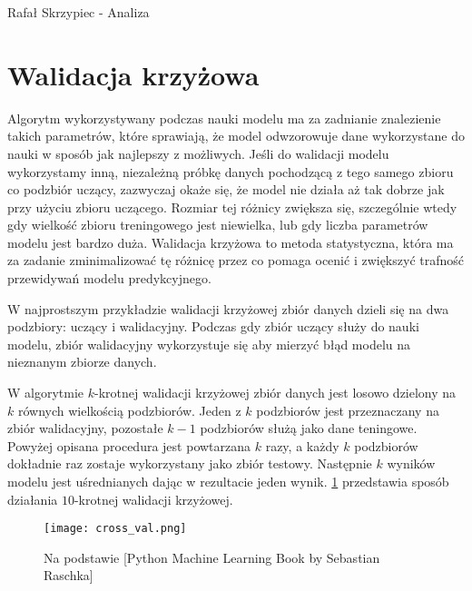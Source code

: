 \documentclass[]{article}
\author{Rafa\l \vspace{1cm} Skrzypiec}
\theoremstyle{definition}
\begin{document}

{\large Rafał Skrzypiec - Analiza}
\vspace{1cm}

\section{Walidacja krzyżowa}

Algorytm wykorzystywany podczas nauki modelu ma za zadnianie znalezienie takich parametrów, które sprawiają, że model odwzorowuje dane wykorzystane do nauki w sposób jak najlepszy z możliwych. Jeśli do walidacji modelu wykorzystamy inną, niezależną próbkę danych pochodzącą z tego samego zbioru co podzbiór uczący, zazwyczaj okaże się, że model nie działa aż tak dobrze jak przy użyciu zbioru uczącego. Rozmiar tej różnicy zwiększa się, szczególnie wtedy gdy wielkość zbioru treningowego jest niewielka, lub gdy liczba parametrów modelu jest bardzo duża.
Walidacja krzyżowa to metoda statystyczna, która ma za zadanie zminimalizować tę różnicę przez co pomaga ocenić i zwiększyć trafność przewidywań modelu predykcyjnego. 


W najprostszym przykładzie walidacji krzyżowej zbiór danych dzieli się na dwa podzbiory: uczący i walidacyjny. Podczas gdy zbiór uczący służy do nauki modelu, zbiór walidacyjny wykorzystuje się aby mierzyć błąd modelu na nieznanym zbiorze danych. 
		
W algorytmie $k$-krotnej walidacji krzyżowej zbiór danych jest losowo dzielony na $k$ równych wielkością podzbiorów. Jeden z $k$ podzbiorów jest przeznaczany na zbiór walidacyjny, pozostałe $k-1$ podzbiorów służą jako dane teningowe. Powyżej opisana procedura jest powtarzana $k$ razy, a każdy $k$ podzbiorów dokładnie raz zostaje wykorzystany jako zbiór testowy. Następnie $k$ wyników modelu jest uśrednianych dając w rezultacie jeden wynik. \figurename{} \ref{fig:cross-val} przedstawia sposób działania $10$-krotnej walidacji krzyżowej.

	\begin{figure}[htp!]
		\centering
		\texttt{[image: cross\_val.png]}
		\caption{Na podstawie [Python Machine Learning
			Book by Sebastian Raschka]}
		\label{fig:cross-val}
	\end{figure}
\end{document}
